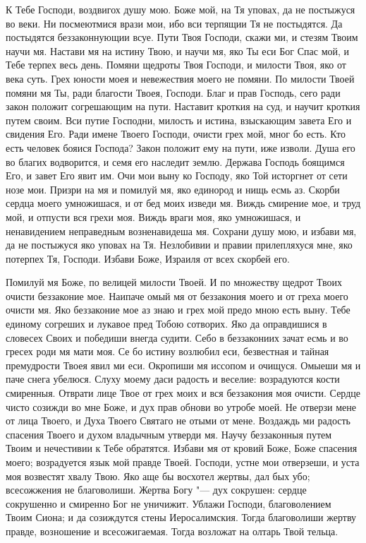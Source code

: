 

К Тебе Господи, воздвигох душу мою. Боже мой, на Тя уповах, да не постыжуся во веки. Ни посмеютмися врази мои, ибо вси терпящии Тя не постыдятся. Да постыдятся беззаконнующии всуе. Пути Твоя Господи, скажи ми, и стезям Твоим научи мя. Настави мя на истину Твою, и научи мя, яко Ты еси Бог Спас мой, и Тебе терпех весь день. Помяни щедроты Твоя Господи, и милости Твоя, яко от века суть. Грех юности моея и невежествия моего не помяни. По милости Твоей помяни мя Ты, ради благости Твоея, Господи. Благ и прав Господь, сего ради закон положит согрешающим на пути. Наставит кроткия на суд, и научит кроткия путем своим. Вси путие Господни, милость и истина, взыскающим завета Его и свидения Его. Ради имене Твоего Господи, очисти грех мой, мног бо есть. Кто есть человек бояися Господа? Закон положит ему на пути, иже изволи. Душа его во благих водворится, и семя его наследит землю. Держава Господь боящимся Его, и завет Его явит им. Очи мои выну ко Господу, яко Той исторгнет от сети нозе мои. Призри на мя и помилуй мя, яко единород и нищь есмь аз. Скорби сердца моего умножишася, и от бед моих изведи мя. Виждь смирение мое, и труд мой, и отпусти вся грехи моя. Виждь враги моя, яко умножишася, и ненавидением неправедным возненавидеша мя. Сохрани душу мою, и избави мя, да не постыжуся яко уповах на Тя. Незлобивии и правии прилепляхуся мне, яко потерпех Тя, Господи. Избави Боже, Израиля от всех скорбей его. 




Помилуй мя Боже, по велицей милости Твоей. И по множеству щедрот Твоих очисти беззаконие мое. Наипаче омый мя от беззакония моего и от греха моего очисти мя. Яко беззаконие мое аз знаю и грех мой предо мною есть выну. Тебе единому согреших и лукавое пред Тобою сотворих. Яко да оправдишися в словесех Своих и победиши внегда судити. Себо в беззакониих зачат есмь и во гресех роди мя мати моя. Се бо истину возлюбил еси, безвестная и тайная премудрости Твоея явил ми еси. Окропиши мя иссопом и очищуся. Омыеши мя и паче снега убелюся. Слуху моему даси радость и веселие: возрадуются кости смиренныя. Отврати лице Твое от грех моих и вся беззакония моя очисти. Сердце чисто созижди во мне Боже, и дух прав обнови во утробе моей. Не отверзи мене от лица Твоего, и Духа Твоего Святаго не отыми от мене. Воздаждь ми радость спасения Твоего и духом владычным утверди мя. Научу беззаконныя путем Твоим и нечестивии к Тебе обратятся. Избави мя от кровий Боже, Боже спасения моего; возрадуется язык мой правде Твоей. Господи, устне мои отверзеши, и уста моя возвестят хвалу Твою. Яко аще бы восхотел жертвы, дал бых убо; всесожжения не благоволиши. Жертва Богу "--- дух сокрушен: сердце сокрушенно и смиренно Бог не уничижит. Ублажи Господи, благоволением Твоим Сиона; и да созиждутся стены Иеросалимския. Тогда благоволиши жертву правде, возношение и всесожигаемая. Тогда возложат на олтарь Твой тельца.

